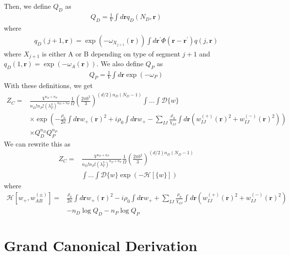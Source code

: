\documentclass{article}
\begin{document}
Then, we define $Q_D$ as
\begin{align*}
  Q_D = \frac{1}{V} \int d\mathbf{r} q_D (N_D, \mathbf{r})
\end{align*}
where
\begin{align*}
  q_D(j+1, \mathbf{r}) = \exp(-\omega_{X_{j+1}}(\mathbf{r}))
    \int d \mathbf{r}^\prime \Phi(\mathbf{r} - \mathbf{r}^\prime)
    q(j, \mathbf{r})
\end{align*}
where $X_{j+1}$ is either A or B depending on type of segment $j+1$
  and $q_D(1, \mathbf{r}) = \exp(-\omega_A(\mathbf{r}))$.
We also define $Q_P$ as
\begin{align*}
  Q_P = \frac{1}{V} \int d\mathbf{r} \exp (-\omega_P)
\end{align*}
With these definitions, we get
\begin{align*}
  Z_C =& \frac{V^{n_D+n_P}}
              {n_D!n_P! \left( \lambda_T^3 \right)^{n_D+n_P}}
    \frac{1}{\Omega}
    \left( \frac{2\pi b^2}{3} \right)
      ^{(d/2)n_D(N_D-1)}
    \int \hdots \int \mathcal{D} \{w\} \\
    &\times \exp \left(
      - \frac{\rho_0}{2\kappa} \int d \mathbf{r} w_+(\mathbf{r})^2
      + i \rho_0 \int d\mathbf{r} w_+
      - \sum_{IJ}
      \frac{\rho_0}{\chi_{IJ}}
      \int d \mathbf{r}
      \left(
        w_{IJ}^{(+)} (\mathbf{r})^2 + w_{IJ}^{(-)} (\mathbf{r})^2
      \right)
    \right) \\
    &\times Q_D^{n_D} Q_P^{n_P}
\end{align*}
We can rewrite this as
\begin{align*}
  Z_C =& \frac{V^{n_D+n_P}}
              {n_D!n_P! \left( \lambda_T^3 \right)^{n_D+n_P}}
    \frac{1}{\Omega}
    \left( \frac{2\pi b^2}{3} \right)
      ^{(d/2)n_D(N_D-1)} \\
    &\int \hdots \int \mathcal{D} \{w\}
    \exp \left(
      -\mathcal{H}[\{w\}]
    \right)
\end{align*}
where
\begin{align*}
  \mathcal{H}[w_+, w_{AB}^{(\pm)}] =&
    \frac{\rho_0}{2\kappa} \int d \mathbf{r} w_+(\mathbf{r})^2
    - i \rho_0 \int d\mathbf{r} w_+
    + \sum_{IJ}
    \frac{\rho_0}{\chi_{IJ}}
    \int d \mathbf{r}
    \left(
      w_{IJ}^{(+)} (\mathbf{r})^2 + w_{IJ}^{(-)} (\mathbf{r})^2
    \right) \\
    &- n_D \log Q_D - n_P \log Q_P
\end{align*}

\section{Grand Canonical Derivation}
\end{document}
